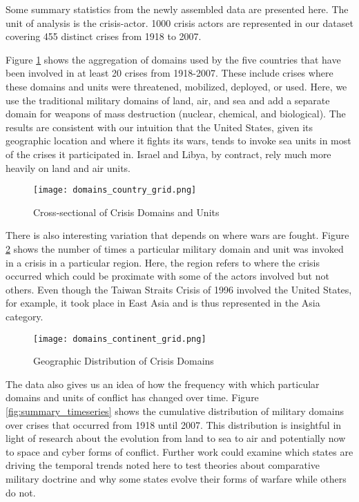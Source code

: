 \documentclass[12pt,letterpaper]{article}
\begin{document}
		Some summary statistics from the newly assembled data are presented here. The unit of analysis is the crisis-actor. 1000 crisis actors are represented in our dataset covering 455 distinct crises from 1918 to 2007.
		
		Figure \ref{fig:summary_crosssec} shows the aggregation of domains used by the five countries that have been involved in at least 20 crises from 1918-2007. These include crises where these domains and units were threatened, mobilized, deployed, or used. Here, we use the traditional military domains of land, air, and sea and add a separate domain for weapons of mass destruction (nuclear, chemical, and biological). The results are consistent with our intuition that the United States, given its geographic location and where it fights its wars, tends to invoke sea units in most of the crises it participated in. Israel and Libya, by contract, rely much more heavily on land and air units.
		
		\begin{figure}[H]
			\centering
			\texttt{[image: domains\_country\_grid.png]}
			\caption{Cross-sectional of Crisis Domains and Units}
			\label{fig:summary_crosssec}
		\end{figure}
		
		There is also interesting variation that depends on where wars are fought. Figure \ref{fig:summary_region} shows the number of times a particular military domain and unit was invoked in a crisis in a particular region. Here, the region refers to where the crisis occurred which could be proximate with some of the actors involved but not others. Even though the Taiwan Straits Crisis of 1996 involved the United States, for example, it took place in East Asia and is thus represented in the Asia category.
		
		\begin{figure}[H]
			\centering
			\texttt{[image: domains\_continent\_grid.png]}
			\caption{Geographic Distribution of Crisis Domains}
			\label{fig:summary_region}
		\end{figure}
		
		The data also gives us an idea of how the frequency with which particular domains and units of conflict has changed over time. Figure \ref{fig:summary_timeseries} shows the cumulative distribution of military domains over crises that occurred from 1918 until 2007. This distribution is insightful in light of research about the evolution from land to sea to air and potentially now to space and cyber forms of conflict. Further work could examine which states are driving the temporal trends noted here to test theories about comparative military doctrine and why some states evolve their forms of warfare while others do not.
		
\end{document}
